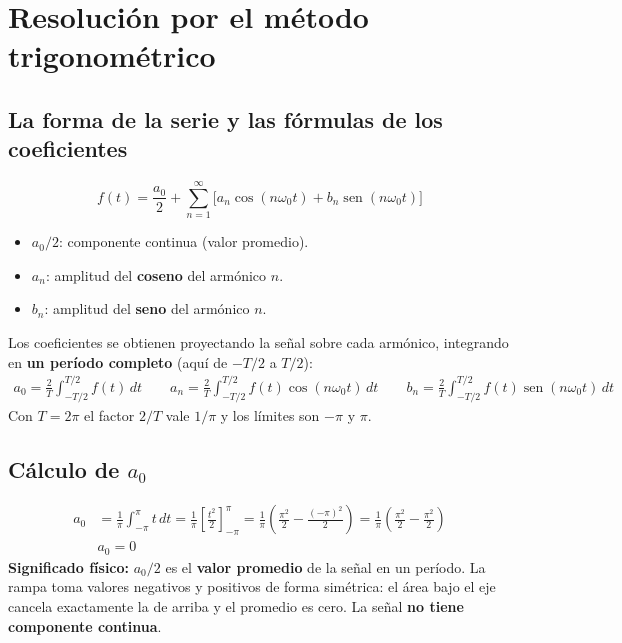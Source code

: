 \documentclass[11pt,a4paper]{article}
\DeclareMathOperator{\sen}{sen}
\begin{document}
\FloatBarrier
\section{Resolución por el método trigonométrico}

\subsection{La forma de la serie y las fórmulas de los coeficientes}
\begin{equation*}
  \boxed{f(t)=\frac{a_0}{2}+\sum_{n=1}^{\infty}\Big[a_n\cos(n\omega_0t)+b_n\sen(n\omega_0t)\Big]}
\end{equation*}
\begin{itemize}
    \item $a_0/2$: componente continua (valor promedio).
    \item $a_n$: amplitud del \textbf{coseno} del armónico $n$.
    \item $b_n$: amplitud del \textbf{seno} del armónico $n$.
\end{itemize}
Los coeficientes se obtienen proyectando la señal sobre cada armónico, integrando
en \textbf{un período completo} (aquí de $-T/2$ a $T/2$):
\begin{align*}
  \boxed{a_0=\frac{2}{T}\int_{-T/2}^{T/2}f(t)\,dt}\qquad
  \boxed{a_n=\frac{2}{T}\int_{-T/2}^{T/2}f(t)\cos(n\omega_0t)\,dt}\qquad
  \boxed{b_n=\frac{2}{T}\int_{-T/2}^{T/2}f(t)\sen(n\omega_0t)\,dt}
\end{align*}
Con $T=2\pi$ el factor $2/T$ vale $1/\pi$ y los límites son $-\pi$ y $\pi$.

\subsection{Cálculo de \texorpdfstring{$a_0$}{a0}}\label{sec:a0}
\begin{align*}
  a_0&=\frac{1}{\pi}\int_{-\pi}^{\pi}t\,dt
     =\frac{1}{\pi}\left[\frac{t^{2}}{2}\right]_{-\pi}^{\pi}
     =\frac{1}{\pi}\left(\frac{\pi^{2}}{2}-\frac{(-\pi)^{2}}{2}\right)
     =\frac{1}{\pi}\left(\frac{\pi^{2}}{2}-\frac{\pi^{2}}{2}\right)\\[4pt]
  &\boxed{a_0=0}
\end{align*}
\textbf{Significado físico:} $a_0/2$ es el \textbf{valor promedio} de la señal en un
período. La rampa toma valores negativos y positivos de forma simétrica: el área bajo
el eje cancela exactamente la de arriba y el promedio es cero. La señal \textbf{no
tiene componente continua}.
\end{document}
